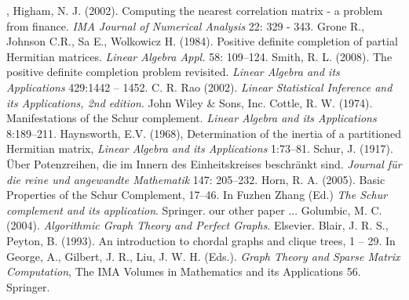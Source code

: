 \documentclass[11pt, a4paper]{article}
\begin{document}
\begin{thebibliography}{MM}
	, Higham, N. J. (2002). Computing the nearest correlation matrix - a problem from finance. \textit{IMA Journal of Numerical Analysis} 22: 329 - 343.
		 Grone R., Johnson C.R., Sa E., Wolkowicz H. (1984). Positive definite completion of partial Hermitian matrices. \textit{Linear Algebra Appl.} 58: 109--124.
	 Smith, R. L. (2008). The positive definite completion problem revisited. \textit{Linear Algebra and its Applications} 429:1442 -- 1452.
	 C. R. Rao (2002). \textit{Linear Statistical Inference and its Applications, 2nd edition}. John Wiley \& Sons, Inc.
	 Cottle, R. W. (1974). Manifestations of the Schur complement. \textit{Linear Algebra and its Applications} 8:189--211. 
	 Haynsworth, E.V. (1968), Determination of the inertia of a partitioned Hermitian matrix,  \textit{Linear  Algebra and its Applications} 1:73--81.
	 Schur, J. (1917). \"Uber Potenzreihen, die im Innern des Einheitskreises beschr\"ankt sind. \textit{Journal f\"ur die reine und angewandte Mathematik} 147: 205--232.
	 Horn, R. A. (2005). Basic  Properties  of  the  Schur  Complement, 17--46. In Fuzhen Zhang (Ed.) \textit{The Schur complement and its application}. Springer.
	 our other paper ...
	 Golumbic, M. C. (2004). \textit{Algorithmic Graph Theory and Perfect Graphs}. Elsevier. 
	 Blair, J. R. S., Peyton, B. (1993). An introduction to chordal graphs and clique trees, 1 -- 29. In George, A., Gilbert, J. R., Liu, J. W. H. (Eds.). \textit{Graph Theory and Sparse Matrix Computation}, The IMA Volumes in Mathematics and its Applications 56. Springer.
\end{thebibliography}
\end{document}
